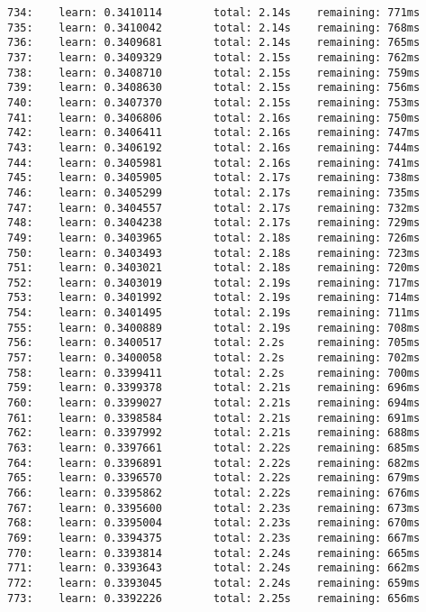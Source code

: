\documentclass[11pt]{article}
\begin{document}
\begin{Verbatim}[commandchars=\\\{\}]
734:    learn: 0.3410114        total: 2.14s    remaining: 771ms
735:    learn: 0.3410042        total: 2.14s    remaining: 768ms
736:    learn: 0.3409681        total: 2.14s    remaining: 765ms
737:    learn: 0.3409329        total: 2.15s    remaining: 762ms
738:    learn: 0.3408710        total: 2.15s    remaining: 759ms
739:    learn: 0.3408630        total: 2.15s    remaining: 756ms
740:    learn: 0.3407370        total: 2.15s    remaining: 753ms
741:    learn: 0.3406806        total: 2.16s    remaining: 750ms
742:    learn: 0.3406411        total: 2.16s    remaining: 747ms
743:    learn: 0.3406192        total: 2.16s    remaining: 744ms
744:    learn: 0.3405981        total: 2.16s    remaining: 741ms
745:    learn: 0.3405905        total: 2.17s    remaining: 738ms
746:    learn: 0.3405299        total: 2.17s    remaining: 735ms
747:    learn: 0.3404557        total: 2.17s    remaining: 732ms
748:    learn: 0.3404238        total: 2.17s    remaining: 729ms
749:    learn: 0.3403965        total: 2.18s    remaining: 726ms
750:    learn: 0.3403493        total: 2.18s    remaining: 723ms
751:    learn: 0.3403021        total: 2.18s    remaining: 720ms
752:    learn: 0.3403019        total: 2.19s    remaining: 717ms
753:    learn: 0.3401992        total: 2.19s    remaining: 714ms
754:    learn: 0.3401495        total: 2.19s    remaining: 711ms
755:    learn: 0.3400889        total: 2.19s    remaining: 708ms
756:    learn: 0.3400517        total: 2.2s     remaining: 705ms
757:    learn: 0.3400058        total: 2.2s     remaining: 702ms
758:    learn: 0.3399411        total: 2.2s     remaining: 700ms
759:    learn: 0.3399378        total: 2.21s    remaining: 696ms
760:    learn: 0.3399027        total: 2.21s    remaining: 694ms
761:    learn: 0.3398584        total: 2.21s    remaining: 691ms
762:    learn: 0.3397992        total: 2.21s    remaining: 688ms
763:    learn: 0.3397661        total: 2.22s    remaining: 685ms
764:    learn: 0.3396891        total: 2.22s    remaining: 682ms
765:    learn: 0.3396570        total: 2.22s    remaining: 679ms
766:    learn: 0.3395862        total: 2.22s    remaining: 676ms
767:    learn: 0.3395600        total: 2.23s    remaining: 673ms
768:    learn: 0.3395004        total: 2.23s    remaining: 670ms
769:    learn: 0.3394375        total: 2.23s    remaining: 667ms
770:    learn: 0.3393814        total: 2.24s    remaining: 665ms
771:    learn: 0.3393643        total: 2.24s    remaining: 662ms
772:    learn: 0.3393045        total: 2.24s    remaining: 659ms
773:    learn: 0.3392226        total: 2.25s    remaining: 656ms

\end{Verbatim}
\end{document}
